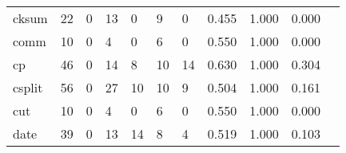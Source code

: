 \begin{longtable}{lp{1.20cm}p{1.20cm}p{1.20cm}p{1.20cm}p{1.20cm}p{1.20cm}p{1.20cm}p{1.20cm}p{1.20cm}p{1.20cm}}
cksum     &                                    22 &                                                  0 &                                                 13 &                                                  0 &                                                  9 &                                                  0 &                                         0.455 &                                              1.000 &                                              0.000 \\
comm      &                                    10 &                                                  0 &                                                  4 &                                                  0 &                                                  6 &                                                  0 &                                         0.550 &                                              1.000 &                                              0.000 \\
cp        &                                    46 &                                                  0 &                                                 14 &                                                  8 &                                                 10 &                                                 14 &                                         0.630 &                                              1.000 &                                              0.304 \\
csplit    &                                    56 &                                                  0 &                                                 27 &                                                 10 &                                                 10 &                                                  9 &                                         0.504 &                                              1.000 &                                              0.161 \\
cut       &                                    10 &                                                  0 &                                                  4 &                                                  0 &                                                  6 &                                                  0 &                                         0.550 &                                              1.000 &                                              0.000 \\
date      &                                    39 &                                                  0 &                                                 13 &                                                 14 &                                                  8 &                                                  4 &                                         0.519 &                                              1.000 &                                              0.103 \\

\end{longtable}
